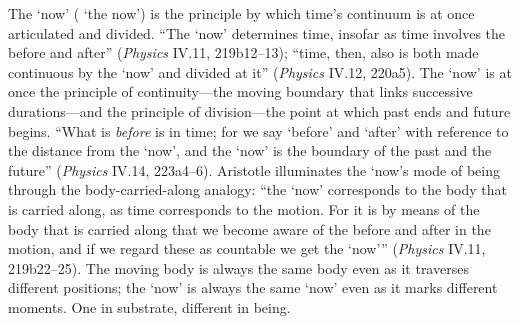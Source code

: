 The `now' ( `the now') is the principle by which time's continuum is at once articulated and divided. ``The `now' determines time, insofar as time involves the before and after'' (\textit{Physics} IV.11, 219b12--13); ``time, then, also is both made continuous by the `now' and divided at it'' (\textit{Physics} IV.12, 220a5). The `now' is at once the principle of continuity---the moving boundary that links successive durations---and the principle of division---the point at which past ends and future begins. ``What is \textit{before} is in time; for we say `before' and `after' with reference to the distance from the `now', and the `now' is the boundary of the past and the future'' (\textit{Physics} IV.14, 223a4--6). Aristotle illuminates the `now's mode of being through the body-carried-along analogy: ``the `now' corresponds to the body that is carried along, as time corresponds to the motion. For it is by means of the body that is carried along that we become aware of the before and after in the motion, and if we regard these as countable we get the `now''' (\textit{Physics} IV.11, 219b22--25). The moving body is always the same body even as it traverses different positions; the `now' is always the same `now' even as it marks different moments. One in substrate, different in being.

